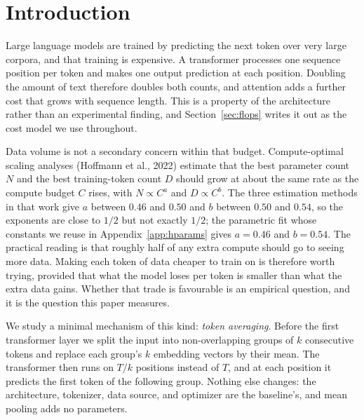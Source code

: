 \documentclass[11pt]{article}
\begin{document}
\tableofcontents
\newpage

\section{Introduction}

Large language models are trained by predicting the next token over very
large corpora, and that training is expensive. A transformer processes one
sequence position per token and makes one output prediction at each
position. Doubling the amount of text therefore doubles both counts, and
attention adds a further cost that grows with sequence length. This is a
property of the architecture rather than an experimental finding, and
Section~\ref{sec:flops} writes it out as the cost model we use throughout.

Data volume is not a secondary concern within that budget. Compute-optimal
scaling analyses (Hoffmann et al., 2022) estimate that the best
parameter count $N$ and the best training-token count $D$ should grow at
about the same rate as the compute budget $C$ rises, with $N \propto C^{a}$
and $D \propto C^{b}$. The three estimation methods in that work give $a$
between $0.46$ and $0.50$ and $b$ between $0.50$ and $0.54$, so the exponents
are close to $1/2$ but not exactly $1/2$; the parametric fit whose constants
we reuse in Appendix~\ref{app:hparams} gives $a = 0.46$ and $b = 0.54$. The
practical reading is that roughly half of any extra compute should go to
seeing more data. Making each token of data cheaper to train on is therefore
worth trying, provided that what the model loses per token is smaller than
what the extra data gains. Whether that trade is favourable is an empirical
question, and it is the question this paper measures.

We study a minimal mechanism of this kind: \emph{token averaging}. Before
the first transformer layer we split the input into non-overlapping groups
of $k$ consecutive tokens and replace each group's $k$ embedding vectors by
their mean. The transformer then runs on $T/k$ positions instead of $T$, and
at each position it predicts the first token of the following group. Nothing
else changes: the architecture, tokenizer, data source, and optimizer are
the baseline's, and mean pooling adds no parameters.
\end{document}
